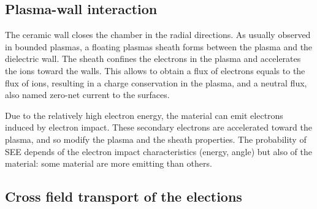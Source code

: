   \subsection*{Plasma-wall interaction}

    The ceramic wall closes the chamber in the radial directions.
    As usually observed in bounded plasmas, a floating plasmas sheath forms between the plasma and the dielectric wall.
    The sheath confines the electrons in the plasma and accelerates the ions toward the walls.
    This allows to obtain a flux of electrons equals to the flux of ions, resulting in a charge conservation in the plasma, and a neutral flux, also named zero-net current to the surfaces.

    Due to the relatively high electron energy, the material can emit electrons induced by electron impact.
    These secondary electrons are accelerated toward the plasma, and so modify the plasma and the sheath properties.
    The probability of \ac{SEE} depends of the electron impact characteristics (energy, angle) but also of the material\string: some material are more emitting than others.

  \subsection*{Cross field transport of the elections}
  
